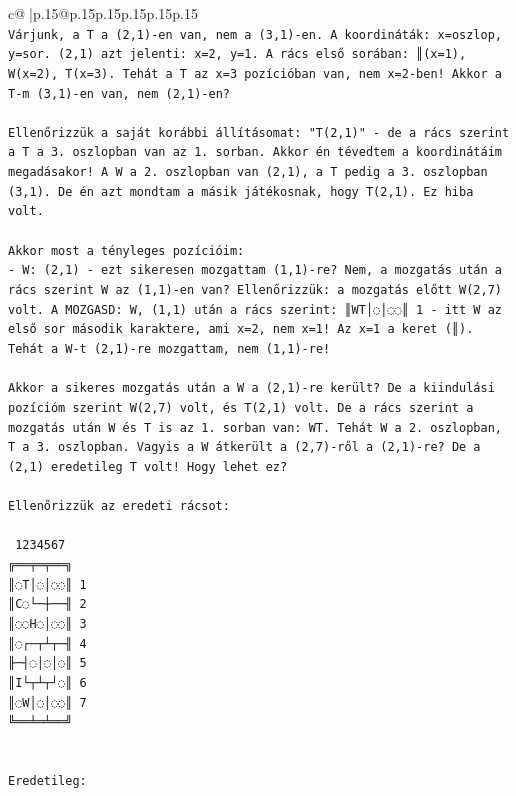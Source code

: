 \documentclass{article}
\begin{document}
{\begin{supertabular}{c@{$\;$}|p{.15\linewidth}@{}p{.15\linewidth}p{.15\linewidth}p{.15\linewidth}p{.15\linewidth}p{.15\linewidth}}
{{{\\ 
\texttt{Várjunk, a T a (2,1){-}en van, nem a (3,1){-}en. A koordináták: x=oszlop, y=sor. (2,1) azt jelenti: x=2, y=1. A rács első sorában: ║(x=1), W(x=2), T(x=3). Tehát a T az x=3 pozícióban van, nem x=2{-}ben! Akkor a T{-}m (3,1){-}en van, nem (2,1){-}en?} \\
\\ 
\texttt{Ellenőrizzük a saját korábbi állításomat: "T(2,1)" {-} de a rács szerint a T a 3. oszlopban van az 1. sorban. Akkor én tévedtem a koordinátáim megadásakor! A W a 2. oszlopban van (2,1), a T pedig a 3. oszlopban (3,1). De én azt mondtam a másik játékosnak, hogy T(2,1). Ez hiba volt.} \\
\\ 
\texttt{Akkor most a tényleges pozícióim:} \\
\texttt{{-} W: (2,1) {-} ezt sikeresen mozgattam (1,1){-}re? Nem, a mozgatás után a rács szerint W az (1,1){-}en van? Ellenőrizzük: a mozgatás előtt W(2,7) volt. A MOZGASD: W, (1,1) után a rács szerint: ║WT│◌│◌◌║ 1 {-} itt W az első sor második karaktere, ami x=2, nem x=1! Az x=1 a keret (║). Tehát a W{-}t (2,1){-}re mozgattam, nem (1,1){-}re!} \\
\\ 
\texttt{Akkor a sikeres mozgatás után a W a (2,1){-}re került? De a kiindulási pozícióm szerint W(2,7) volt, és T(2,1) volt. De a rács szerint a mozgatás után W és T is az 1. sorban van: WT. Tehát W a 2. oszlopban, T a 3. oszlopban. Vagyis a W átkerült a (2,7){-}ről a (2,1){-}re? De a (2,1) eredetileg T volt! Hogy lehet ez?} \\
\\ 
\texttt{Ellenőrizzük az eredeti rácsot:} \\
\\ 
\texttt{ 1234567} \\
\texttt{╔══╤═╤══╗} \\
\texttt{║◌T│◌│◌◌║ 1} \\
\texttt{║C◌└─┼──╢ 2} \\
\texttt{║◌◌H◌│◌◌║ 3} \\
\texttt{║◌┌─┬┴┬─╢ 4} \\
\texttt{╟─┤◌│◌│◌║ 5} \\
\texttt{║I└┬┴┬┘◌║ 6} \\
\texttt{║◌W│◌│◌◌║ 7} \\
\texttt{╚══╧═╧══╝} \\
\\ 
\\ 
\texttt{Eredetileg:} \\
}}}
\end{supertabular}}
\end{document}
